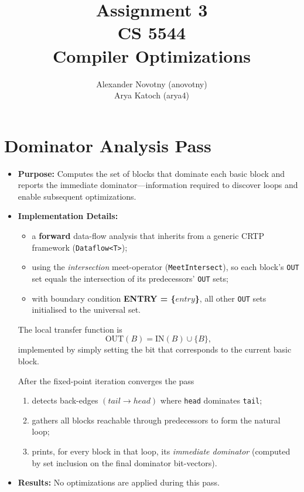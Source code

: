 \documentclass{article}
\title{Assignment 3\\{\large CS 5544}\\{\large Compiler Optimizations}}
\author{Alexander Novotny (anovotny)\\Arya Katoch (arya4)}
\begin{document}
\maketitle

\section{Dominator Analysis Pass}
\begin{itemize}
	\item \textbf{Purpose:} Computes the set of blocks that dominate each basic block and reports the immediate dominator—information required to discover loops and enable subsequent optimizations.
	\item \textbf{Implementation Details:}
	      \begin{itemize}
		      \item a \textbf{forward} data-flow analysis that inherits from a generic
		            CRTP framework (\verb|Dataflow<T>|);
		      \item using the \emph{intersection} meet-operator
		            (\verb|MeetIntersect|), so each block's \texttt{OUT} set equals the
		            intersection of its predecessors' \texttt{OUT} sets;
		      \item with boundary condition \textbf{ENTRY = \{$entry$\}}, all other
		            \texttt{OUT} sets initialised to the universal set.
	      \end{itemize}
	      The local transfer function is
	      \[
		      \text{OUT}(B)=\text{IN}(B)\cup\{B\},
	      \]
	      implemented by simply setting the bit that corresponds to the current
	      basic block.

	      After the fixed-point iteration converges the pass

	      \begin{enumerate}\itemsep0.2ex
		      \item detects back-edges \((tail \rightarrow head)\) where
		            \texttt{head} dominates \texttt{tail};
		      \item gathers all blocks reachable through predecessors to form the
		            natural loop;
		      \item prints, for every block in that loop, its \emph{immediate
			            dominator} (computed by set inclusion on the final dominator
		            bit-vectors).
	      \end{enumerate}

	\item \textbf{Results:} No optimizations are applied during this pass.

\end{itemize}
\end{document}
